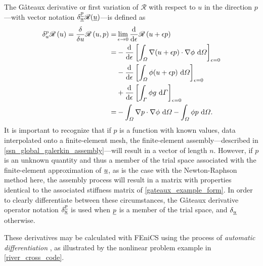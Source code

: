The G\^{a}teaux derivative or first variation of $\mathscr{R}$ with respect to $u$ in the direction $p$---with vector notation $\delta_{\underline{u}}^{\underline{p}} \mathscr{R} (\underline{u})$---is defined as
\begin{align*}
 \delta_{u}^{p}\mathscr{R}\left( u \right) = \frac{\delta}{\delta u} \mathscr{R}\left( u,p \right) = &\lim_{\epsilon \rightarrow 0} \frac{\mathrm{d}{^{}} }{\mathrm{d} \epsilon{^{}} } \mathscr{R} \left(u + \epsilon p \right) \\
  = &- \frac{\mathrm{d}{^{}} }{\mathrm{d} \epsilon{^{}} } \left[ \int_{\varOmega} \nabla (u + \epsilon p) \cdot \nabla \phi \ \mathrm{d}\varOmega \right]_{\epsilon = 0} \\
  &- \frac{\mathrm{d}{^{}} }{\mathrm{d} \epsilon{^{}} } \left[ \int_{\varOmega} \phi (u + \epsilon p) \ \mathrm{d}\varOmega \right]_{\epsilon = 0} \\
  &+ \frac{\mathrm{d}{^{}} }{\mathrm{d} \epsilon{^{}} } \left[ \int_{\varGamma} \phi g \ \mathrm{d}\varGamma \right]_{\epsilon = 0} \\
  = &- \int_{\varOmega} \nabla p \cdot \nabla \phi \ \mathrm{d}\varOmega - \int_{\varOmega} \phi p \ \mathrm{d}\varOmega.
\end{align*}
It is important to recognize that if $p$ is a function with known values, \ie data interpolated onto a finite-element mesh, the finite-element assembly---described in \cref{ssn_global_galerkin_assembly}---will result in a vector of length $n$.  However, if $p$ is an unknown quantity and thus a member of the trial space associated with the finite-element approximation of $\underline{u}$, as is the case with the Newton-Raphson method here, the assembly process will result in a matrix with properties identical to the associated stiffness matrix of \cref{gateaux_example_form}.  In order to clearly differentiate between these circumstances, the G\^{a}teaux derivative operator notation $\delta_{\underline{u}}^{\underline{p}}$ is used when $\underline{p}$ is a member of the trial space, and $\delta_{\underline{u}}$ otherwise.

These derivatives may be calculated with FEniCS using the process of  \emph{automatic differentiation} \citep{nocedal_2000}, as illustrated by the nonlinear problem example in \cref{river_cross_code}.

